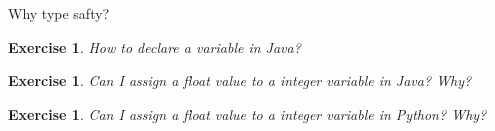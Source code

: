 \documentclass[a4paper]{article}
\newcommand{\pythonfile}[1]{}
\newtheorem{exercise}[theorem]{Exercise}
\begin{document}
Why type safty?
\pythonfile{../code/type_safty.py}



\begin{exercise}
    How to declare a variable in Java?   
\end{exercise}

\begin{exercise}
    \label{ex:java.assign}
    Can I assign a float value to a integer variable in Java? Why?
\end{exercise}

\begin{exercise}
    \label{ex:python.assign}
    Can I assign a float value to a integer variable in Python? Why?
\end{exercise}
\end{document}
